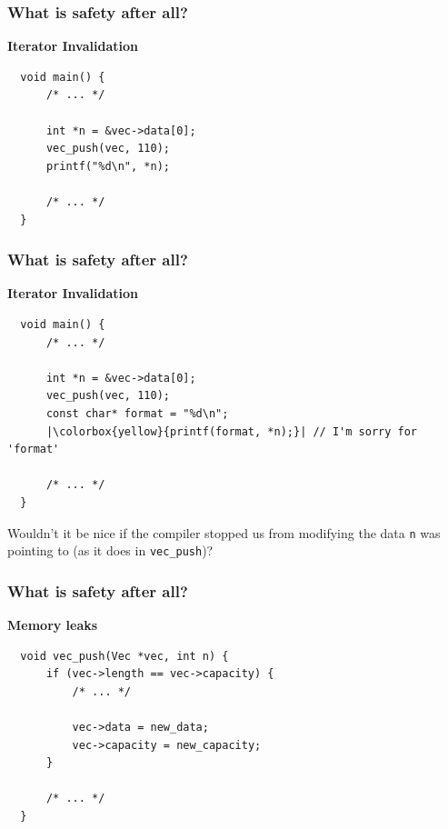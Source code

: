 \documentclass[aspectratio=1610,t]{beamer}
\begin{document}

\begin{frame}[fragile]
\frametitle{What is safety after all?}
\textbf{Iterator Invalidation}

\begin{verbatim}
  void main() {
      /* ... */

      int *n = &vec->data[0];
      vec_push(vec, 110);
      printf("%d\n", *n);

      /* ... */
  }
\end{verbatim}

\end{frame}


\begin{frame}[fragile]
\frametitle{What is safety after all?}
\textbf{Iterator Invalidation}

\begin{verbatim}
  void main() {
      /* ... */

      int *n = &vec->data[0];
      vec_push(vec, 110);
      const char* format = "%d\n";
      |\colorbox{yellow}{printf(format, *n);}| // I'm sorry for 'format'

      /* ... */
  }
\end{verbatim}

Wouldn't it be nice if the compiler stopped us from modifying the data \texttt{n} was pointing to (as it does in \texttt{vec\_push})?

\end{frame}


\begin{frame}[fragile]
\frametitle{What is safety after all?}
\textbf{Memory leaks}

\begin{verbatim}
  void vec_push(Vec *vec, int n) {
      if (vec->length == vec->capacity) {
          /* ... */
    
          vec->data = new_data;
          vec->capacity = new_capacity;
      }
    
      /* ... */
  }
\end{verbatim}

\end{frame}

\end{document}
